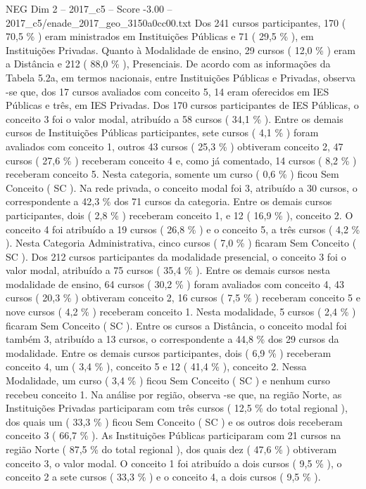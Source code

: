 \begin{textsample}{NEG Dim 2 – 2017\_c5 – Score -3.00 – 2017\_c5/enade\_2017\_geo\_3150a0cc00.txt}
Dos 241 cursos participantes, 170 ( 70,5 \% ) eram ministrados em Instituições Públicas e 71 ( 29,5 \% ), em Instituições Privadas.
Quanto à Modalidade de ensino, 29 cursos ( 12,0 \% ) eram a Distância e 212 ( 88,0 \% ), Presenciais.
De acordo com as informações da Tabela 5.2a, em termos nacionais, entre Instituições Públicas e Privadas, observa -se que, dos 17 cursos avaliados com conceito 5, 14 eram oferecidos em IES Públicas e três, em IES Privadas.
Dos 170 cursos participantes de IES Públicas, o conceito 3 foi o valor modal, atribuído a 58 cursos ( 34,1 \% ).
Entre os demais cursos de Instituições Públicas participantes, sete cursos ( 4,1 \% ) foram avaliados com conceito 1, outros 43 cursos ( 25,3 \% ) obtiveram conceito 2, 47 cursos ( 27,6 \% ) receberam conceito 4 e, como já comentado, 14 cursos ( 8,2 \% ) receberam conceito 5.
Nesta categoria, somente um curso ( 0,6 \% ) ficou Sem Conceito ( SC ).
Na rede privada, o conceito modal foi 3, atribuído a 30 cursos, o correspondente a 42,3 \% dos 71 cursos da categoria.
Entre os demais cursos participantes, dois ( 2,8 \% ) receberam conceito 1, e 12 ( 16,9 \% ), conceito 2.
O conceito 4 foi atribuído a 19 cursos ( 26,8 \% ) e o conceito 5, a três cursos ( 4,2 \% ).
Nesta Categoria Administrativa, cinco cursos ( 7,0 \% ) ficaram Sem Conceito ( SC ).
Dos 212 cursos participantes da modalidade presencial, o conceito 3 foi o valor modal, atribuído a 75 cursos ( 35,4 \% ).
Entre os demais cursos nesta modalidade de ensino, 64 cursos ( 30,2 \% ) foram avaliados com conceito 4, 43 cursos ( 20,3 \% ) obtiveram conceito 2, 16 cursos ( 7,5 \% ) receberam conceito 5 e nove cursos ( 4,2 \% ) receberam conceito 1.
Nesta modalidade, 5 cursos ( 2,4 \% ) ficaram Sem Conceito ( SC ).
Entre os cursos a Distância, o conceito modal foi também 3, atribuído a 13 cursos, o correspondente a 44,8 \% dos 29 cursos da modalidade.
Entre os demais cursos participantes, dois ( 6,9 \% ) receberam conceito 4, um ( 3,4 \% ), conceito 5 e 12 ( 41,4 \% ), conceito 2.
Nessa Modalidade, um curso ( 3,4 \% ) ficou Sem Conceito ( SC ) e nenhum curso recebeu conceito 1.
Na análise por região, observa -se que, na região Norte, as Instituições Privadas participaram com três cursos ( 12,5 \% do total regional ), dos quais um ( 33,3 \% ) ficou Sem Conceito ( SC ) e os outros dois receberam conceito 3 ( 66,7 \% ).
As Instituições Públicas participaram com 21 cursos na região Norte ( 87,5 \% do total regional ), dos quais dez ( 47,6 \% ) obtiveram conceito 3, o valor modal.
O conceito 1 foi atribuído a dois cursos ( 9,5 \% ), o conceito 2 a sete cursos ( 33,3 \% ) e o conceito 4, a dois cursos ( 9,5 \% ).

\end{textsample}
